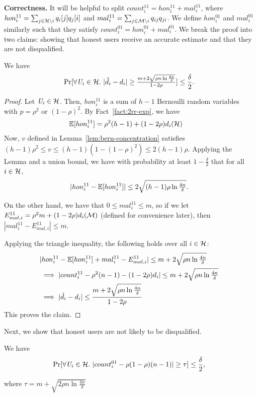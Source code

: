 \noindent \textbf{Correctness.} 
It will be helpful to split $count_i^{11} = hon_i^{11} + mal_i^{11}$, where $hon_i^{11} = \sum_{j \in \mathcal{H} \setminus i} q_{i}[j] q_{j}[i]$ and $mal_i^{11} = \sum_{j \in \mathcal{M} \setminus i} q_{ij} q_{ji}$. We define $hon_i^{01}$ and $mal_i^{01}$ similarly such that they satisfy $count_i^{01} = hon_i^{01} + mal_i^{01}$. We break the proof into two claims: showing that honest users receive an accurate estimate and that they are not disqualified.

\begin{claim}\label{claim:honest-response-concentration-1} We have
\[
    \Pr[\forall \textit{U}_i \in \mathcal{H}.~|\hat{d}_i - d_i| \geq \tfrac{m + 2 \sqrt{\rho n \ln \frac{4n}{\delta}}}{1-2\rho}] \leq \frac{\delta}{2}.
\]
\end{claim}
\begin{proof} 
Let $\textit{U}_i \in \mathcal{H}$. Then, $hon_i^{11}$ is a sum of $h-1$ Bernoulli random variables with $p = \rho^2$ or $(1-\rho)^2$. By Fact~\ref{fact:2rr-exp}, we have
\begin{align*}
    \operatorname{\mathbb{E}}[hon_i^{11}] &= \rho^2 (h-1) + (1-2\rho) d_i(\mathcal{H})
\end{align*}
Now, $v$ defined in Lemma~\ref{lem:bern-concentration} satisfies $(h-1) \rho^2 \leq v \leq (h-1)(1-(1-\rho)^2) \leq 2(h-1)\rho$. Applying the Lemma and a union bound, we have with probability at least $1-\frac{\delta}{2}$ that for all $i \in \mathcal{H}$,
\begin{equation}\label{eq:hon-player-bits}
    |hon_i^{11} - \operatorname{\mathbb{E}}[hon_i^{11}]| \leq 2\sqrt{(h-1)\rho \ln \tfrac{4n}{\delta}}.
\end{equation}

On the other hand, we have that $0 \leq mal_i^{11} \leq m$, so if we let $E_{mal,i}^{11} = \rho^2 m + (1-2\rho) d_i(\mathcal{M})$ (defined for convenience later), then $|mal_i^{11} - E_{mal,i}^{11}| \leq m$.

Applying the triangle inequality, the following holds over all $i \in \mathcal{H}$:
\begin{align*}
&|hon_i^{11} - \operatorname{\mathbb{E}}[hon_i^{11}] + mal_i^{11} - E_{mal,i}^{11}|
\leq m + 2\sqrt{ \rho n \ln \tfrac{4n}{\delta}} \\
& \implies |count_i^{11} - \rho^2 (n-1) - (1-2\rho) d_i| \leq m + 2\sqrt{ \rho n \ln \tfrac{4n}{\delta}} \\
& \implies |\hat{d}_i - d_i| \leq \frac{m + 2\sqrt{ \rho n \ln \tfrac{4n}{\delta}}}{1-2\rho}
\end{align*}
This proves the claim.
\end{proof}
Next, we show that honest users are not likely to be disqualified.
\begin{claim}\label{claim:honest-response-concentration-2} We have
\[
    \Pr[\forall \textit{U}_i \in \mathcal{H}.~|count_i^{01} - \rho(1-\rho)(n-1)| \geq \tau] \leq \frac{\delta}{2},
\]
\end{claim}
where $\tau = m + \sqrt{2 \rho n \ln \frac{4 n}{\delta}}$


